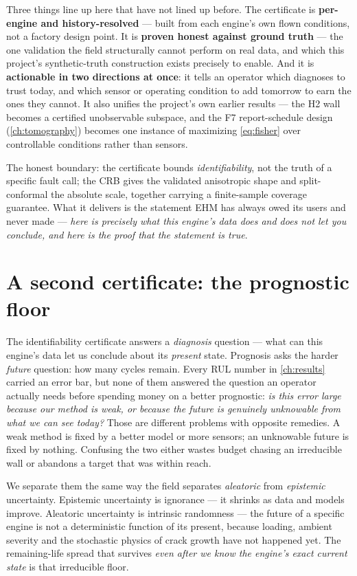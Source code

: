 Three things line up here that have not lined up before. The certificate is
\textbf{per-engine and history-resolved} --- built from each engine's own flown conditions,
not a factory design point. It is \textbf{proven honest against ground truth} --- the one
validation the field structurally cannot perform on real data, and which this project's
synthetic-truth construction exists precisely to enable. And it is \textbf{actionable in two
directions at once}: it tells an operator which diagnoses to trust today, and which sensor or
operating condition to add tomorrow to earn the ones they cannot. It also unifies the
project's own earlier results --- the H2 wall becomes a certified unobservable subspace, and
the F7 report-schedule design (\cref{ch:tomography}) becomes one instance of maximizing
\cref{eq:fisher} over controllable conditions rather than sensors.

The honest boundary: the certificate bounds \emph{identifiability}, not the truth of a
specific fault call; the CRB gives the validated anisotropic shape and split-conformal the
absolute scale, together carrying a finite-sample coverage guarantee. What it delivers is the
statement EHM has always owed its users and never made ---
\emph{here is precisely what this engine's data does and does not let you conclude, and here
is the proof that the statement is true}.

\section{A second certificate: the prognostic floor}
\label{sec:bt-prognostic-floor}

The identifiability certificate answers a \emph{diagnosis} question --- what can this
engine's data let us conclude about its \emph{present} state. Prognosis asks the harder
\emph{future} question: how many cycles remain. Every RUL number in
\cref{ch:results} carried an error bar, but none of them answered the question an operator
actually needs before spending money on a better prognostic: \emph{is this error large
because our method is weak, or because the future is genuinely unknowable from what we can
see today?} Those are different problems with opposite remedies. A weak method is fixed by a
better model or more sensors; an unknowable future is fixed by nothing. Confusing the two
either wastes budget chasing an irreducible wall or abandons a target that was within reach.

We separate them the same way the field separates \emph{aleatoric} from \emph{epistemic}
uncertainty. Epistemic uncertainty is ignorance --- it shrinks as data and models improve.
Aleatoric uncertainty is intrinsic randomness --- the future of a specific engine is not a
deterministic function of its present, because loading, ambient severity and the
stochastic physics of crack growth have not happened yet. The remaining-life spread that
survives \emph{even after we know the engine's exact current state} is that irreducible floor.

